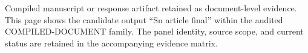 Compiled manuscript or response artifact retained as document-level evidence. This page shows the candidate output ``Sn article final'' within the audited COMPILED-DOCUMENT family. The panel identity, source scope, and current status are retained in the accompanying evidence matrix.
